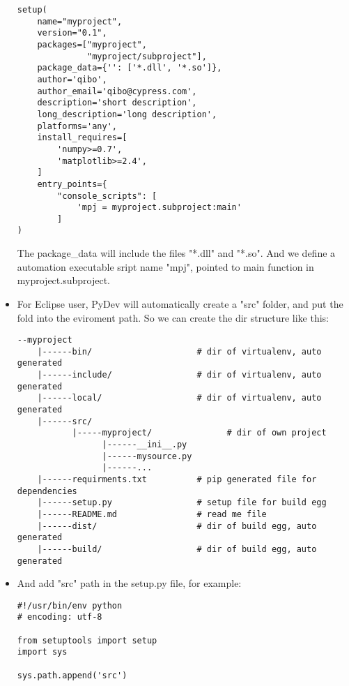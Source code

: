 \documentclass{article}
\begin{document}
\begin{itemize}
\begin{lstlisting}
setup(
    name="myproject",
    version="0.1",
    packages=["myproject", 
              "myproject/subproject"],
    package_data={'': ['*.dll', '*.so']},
    author='qibo',
    author_email='qibo@cypress.com',
    description='short description',
    long_description='long description',
    platforms='any',
    install_requires=[
        'numpy>=0.7',
        'matplotlib>=2.4',
    ]
    entry_points={
        "console_scripts": [
            'mpj = myproject.subproject:main'
        ]
)
\end{lstlisting}
The package\_data will include the files "*.dll" and "*.so". 
And we define a automation executable sript name "mpj", pointed to main function in myproject.subproject.
\item
For Eclipse user, PyDev will automatically create a "src" folder, and put the fold into the eviroment path. So we can create the dir structure like this:
\begin{lstlisting}
--myproject
    |------bin/                     # dir of virtualenv, auto generated
    |------include/                 # dir of virtualenv, auto generated
    |------local/                   # dir of virtualenv, auto generated
    |------src/
           |-----myproject/               # dir of own project 
                 |------__ini__.py
                 |------mysource.py
                 |------...
    |------requirments.txt          # pip generated file for dependencies
    |------setup.py                 # setup file for build egg
    |------README.md                # read me file
    |------dist/                    # dir of build egg, auto generated
    |------build/                   # dir of build egg, auto generated
\end{lstlisting}
\item
And add "src" path in the setup.py file, for example:
\begin{lstlisting}
#!/usr/bin/env python
# encoding: utf-8

from setuptools import setup
import sys

sys.path.append('src')


\end{lstlisting}
\end{itemize}
\end{document}

